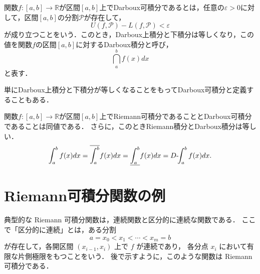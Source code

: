 \begin{definition}[Darboux可積分]
    関数$f : [a,b] \to \mathbb{R}$が区間$[a,b]$上でDarboux可積分であるとは，任意の$\varepsilon > 0$に対して，区間$[a,b]$の分割$\mathcal{P}$が存在して，
    \[
        U(f,\mathcal{P}) - L(f,\mathcal{P}) < \varepsilon
    \]
    が成り立つことをいう．このとき，Darboux上積分と下積分は等しくなり，この値を関数$f$の区間$[a,b]$に対するDarboux積分と呼び，\[\dint_a^b f(x) dx\]と表す．
\end{definition}
単にDarboux上積分と下積分が等しくなることをもってDarboux可積分と定義することもある．

\begin{theorem}[Darboux]
    関数$f:[a,b] \to \mathbb{R}$が区間$[a,b]$上でRiemann可積分であることとDarboux可積分であることは同値である．
    さらに，このときRiemann積分とDarboux積分は等しい．
    \[
    \int_a^b f(x) dx = \overline{\int_{a}^{b}} f(x) dx = \underline{\int_{a}^{b}} f(x) dx = 
    D\text{-}\!\!\int_a^b f(x) dx.
    \]
\end{theorem}

\section{Riemann可積分関数の例}
典型的な Riemann 可積分関数は，連続関数と区分的に連続な関数である．
ここで「区分的に連続」とは，ある分割
\[
a=x_0<x_1<\cdots<x_m=b
\]
が存在して，各開区間 $(x_{i-1},x_i)$ 上で $f$ が連続であり，
各分点 $x_i$ において有限な片側極限をもつことをいう．
後で示すように，このような関数は Riemann 可積分である．

